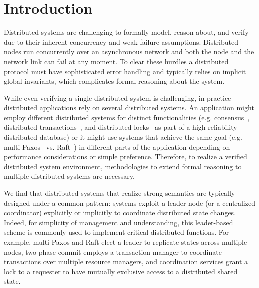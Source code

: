 \section{Introduction}
\label{sec:intro}


Distributed systems are challenging to formally model, reason about, and verify
due to their inherent concurrency and weak failure assumptions. Distributed
nodes run concurrently over an asynchronous network and both the node and the
network link can fail at any moment. To clear these hurdles a distributed
protocol must have sophisticated error handling and typically relies on implicit
global invariants, which complicates formal reasoning about the system.


While even verifying a single distributed system is challenging, in practice
distributed applications rely on several distributed systems. An application
might employ different distributed systems for distinct functionalities (e.g.
consensus~\cite{vivaladifference}, distributed transactions~\cite{gray:2006},
and distributed locks~\cite{chubby, zookeeper} as part of a high reliability
distributed database) or it might use systems that achieve the same goal (e.g.
multi-Paxos~\cite{paxosmadesimple, rvrpaxos} vs. Raft~\cite{raft}) in different
parts of the application depending on performance considerations or simple
preference. Therefore, to realize a verified distributed system environment,
methodologies to extend formal reasoning to multiple distributed systems are
necessary.


We find that distributed systems that realize strong semantics are typically
designed under a common pattern: systems exploit a leader node
(or a centralized coordinator) explicitly or implicitly to coordinate
distributed state changes. Indeed, for simplicity of management and understanding,
this leader-based scheme is commonly used to implement critical distributed
functions. For example, multi-Paxos and Raft elect a leader to replicate states
across multiple nodes, two-phase commit employs a transaction manager to
coordinate transactions over multiple resource managers, and coordination
services grant a lock to a requester to have mutually exclusive access to a
distributed shared state.

